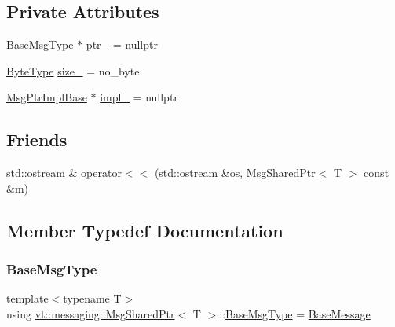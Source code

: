 \subsection*{Private Attributes}
\begin{DoxyCompactItemize}
\item 
\hyperlink{structvt_1_1messaging_1_1_msg_shared_ptr_a778cb9ec8919e4a309d28ed345ac318d}{Base\+Msg\+Type} $\ast$ \hyperlink{structvt_1_1messaging_1_1_msg_shared_ptr_aac5218a8b39004946a523ac4a729a3da}{ptr\+\_\+} = nullptr
\item 
\hyperlink{namespacevt_aab8d55968084610ce3b17057981e9300}{Byte\+Type} \hyperlink{structvt_1_1messaging_1_1_msg_shared_ptr_aa3d0c6c8f14e94de5f4c5e67c81f9ff1}{size\+\_\+} = no\+\_\+byte
\item 
\hyperlink{structvt_1_1messaging_1_1_msg_ptr_impl_base}{Msg\+Ptr\+Impl\+Base} $\ast$ \hyperlink{structvt_1_1messaging_1_1_msg_shared_ptr_aa0cf96203c13d77d691888c852bc333e}{impl\+\_\+} = nullptr
\end{DoxyCompactItemize}
\subsection*{Friends}
\begin{DoxyCompactItemize}
\item 
std\+::ostream \& \hyperlink{structvt_1_1messaging_1_1_msg_shared_ptr_ac412f09ec806f5915ea4a94f3e84d5f4}{operator$<$$<$} (std\+::ostream \&os, \hyperlink{structvt_1_1messaging_1_1_msg_shared_ptr}{Msg\+Shared\+Ptr}$<$ T $>$ const \&m)
\end{DoxyCompactItemize}


\subsection{Member Typedef Documentation}
\mbox{\label{structvt_1_1messaging_1_1_msg_shared_ptr_a778cb9ec8919e4a309d28ed345ac318d}} 
\subsubsection{\texorpdfstring{Base\+Msg\+Type}{BaseMsgType}}
{\footnotesize\ttfamily template$<$typename T$>$ \\
using \hyperlink{structvt_1_1messaging_1_1_msg_shared_ptr}{vt\+::messaging\+::\+Msg\+Shared\+Ptr}$<$ T $>$\+::\hyperlink{structvt_1_1messaging_1_1_msg_shared_ptr_a778cb9ec8919e4a309d28ed345ac318d}{Base\+Msg\+Type} =  \hyperlink{namespacevt_ac34f95a5e2b8109b55bfba52b074443d}{Base\+Message}}

